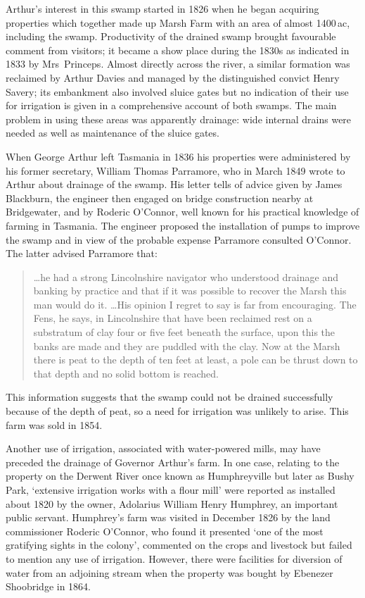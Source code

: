 Arthur's interest in this swamp started in 1826 when he began
acquiring properties which together made up Marsh Farm with an area of
almost 1400\,ac, including the swamp.  Productivity of the drained
swamp brought favourable comment from visitors; it became a show place
during the 1830s as indicated in 1833 by Mrs~Princeps.  Almost
directly across the river, a similar formation was reclaimed by Arthur
Davies and managed by the distinguished convict Henry Savery; its
embankment also involved sluice gates but no indication of their use
for irrigation is given in a comprehensive account of both swamps.
The main problem in using these areas was apparently drainage: wide
internal drains were needed as well as maintenance of the sluice
gates.

When George Arthur left Tasmania in 1836 his properties were
administered by his former secretary, William Thomas Parramore, who in
March 1849 wrote to Arthur about drainage of the swamp.  His letter
tells of advice given by James Blackburn, the engineer then engaged on
bridge construction nearby at Bridgewater, and by Roderic O'Connor,
well known for his practical knowledge of farming in Tasmania.  The
engineer proposed the installation of pumps to improve the swamp and
in view of the probable expense Parramore consulted O'Connor.  The
latter advised Parramore that:
\begin{quote}
	\ldots he had a strong Lincolnshire navigator who understood
	drainage and banking by practice and that if it was possible
	to recover the Marsh this man would do it. \ldots His opinion I
	regret to say is far from encouraging.  The Fens, he says, in
	Lincolnshire that have been reclaimed rest on a substratum of
	clay four or five feet beneath the surface, upon this the
	banks are made and they are puddled with the clay.  Now at the
	Marsh there is peat to the depth of ten feet at least, a pole
	can be thrust down to that depth and no solid bottom is
	reached.
\end{quote}
This information suggests that the swamp could not be drained
successfully because of the depth of peat, so a need for irrigation
was unlikely to arise.  This farm was sold in 1854.

Another use of irrigation, associated with water-powered mills, may
have preceded the drainage of Governor Arthur's farm.  In one case,
relating to the property on the Derwent River once known as
Humphreyville but later as Bushy Park, `extensive irrigation works
with a flour mill' were reported as installed about 1820 by the owner,
Adolarius William Henry Humphrey, an important public servant.
Humphrey's farm was visited in December 1826 by the land commissioner
Roderic O'Connor, who found it presented `one of the most gratifying
sights in the colony', commented on the crops and livestock but failed
to mention any use of irrigation.  However, there were facilities for
diversion of water from an adjoining stream when the property was
bought by Ebenezer Shoobridge in 1864.

